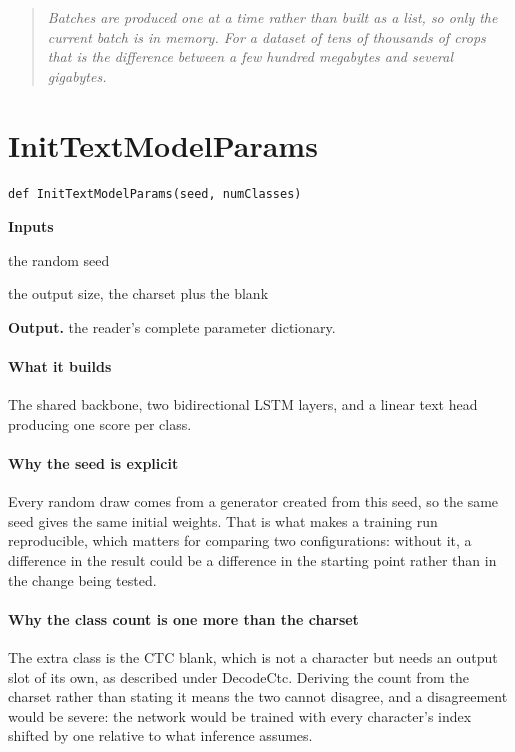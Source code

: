 \begin{quote}\small\itshape Batches are produced one at a time rather than built as a list, so only the current batch is in memory. For a dataset of tens of thousands of crops that is the difference between a few hundred megabytes and several gigabytes.\end{quote}

\section{InitTextModelParams}
\begin{lstlisting}[style=sig]
def InitTextModelParams(seed, numClasses)
\end{lstlisting}

\noindent\textbf{Inputs}
\begin{description}[leftmargin=2.2em,style=nextline,font=\normalfont\ttfamily]\setlength\itemsep{1pt}
  \item[{seed}] \normalfont the random seed
  \item[{numClasses}] \normalfont the output size, the charset plus the blank
\end{description}

\noindent\textbf{Output.} the reader's complete parameter dictionary.


\paragraph{What it builds}
The shared backbone, two bidirectional LSTM layers, and a linear text head producing one score per class.


\paragraph{Why the seed is explicit}
Every random draw comes from a generator created from this seed, so the same seed gives the same initial weights. That is what makes a training run reproducible, which matters for comparing two configurations: without it, a difference in the result could be a difference in the starting point rather than in the change being tested.


\paragraph{Why the class count is one more than the charset}
The extra class is the CTC blank, which is not a character but needs an output slot of its own, as described under DecodeCtc. Deriving the count from the charset rather than stating it means the two cannot disagree, and a disagreement would be severe: the network would be trained with every character's index shifted by one relative to what inference assumes.


